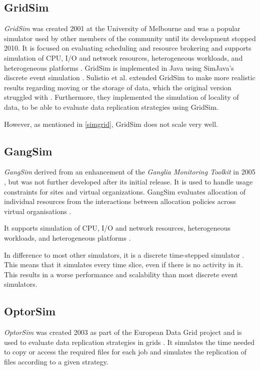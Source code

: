 \subsection{GridSim}
\label{gridsim}

\textit{GridSim} was created 2001 at the University of Melbourne and was a popular simulator used by other members of the community until its development stopped 2010.
It is focused on evaluating scheduling and resource brokering and supports simulation of CPU, I/O and network resources, heterogeneous workloads, and heterogeneous platforms \cite{gridsim}. GridSim is implemented in Java using SimJava's discrete event simulation \cite{gridsim}.
Sulistio et al. \cite{sulistio2008toolkit} extended GridSim to make more realistic results regarding moving or the storage of data, which the original version struggled with \cite{1698650}. Furthermore, they implemented the simulation of locality of data, to be able to evaluate data replication strategies using GridSim.

However, as mentioned in \cref{simgrid}, GridSim does not scale very well.

\subsection{GangSim}

\textit{GangSim} derived from an enhancement of the \textit{Ganglia Monitoring Toolkit} in 2005 \cite{dumitrescu2005gangsim}, but was not further developed after its initial release.
It is used to handle usage constraints for sites and virtual organizations. GangSim evaluates allocation of individual resources from the interactions between allocation policies across virtual organisations \cite{dumitrescu2005gangsim}.

It supports simulation of CPU, I/O and network resources, heterogeneous workloads, and heterogeneous platforms \cite{dumitrescu2005gangsim}.

In difference to most other simulators, it is a discrete time-stepped simulator \cite{dgsim}. This means that it simulates every time slice, even if there is no activity in it. This results in a worse performance and scalability than most discrete event simulators.


\newpage
\subsection{OptorSim}
\textit{OptorSim} was created 2003 as part of the European Data Grid project and is used to evaluate data replication strategies in grids \cite{optorsim}. It simulates the time needed to copy or access the required files for each job and simulates the replication of files according to a given strategy.

